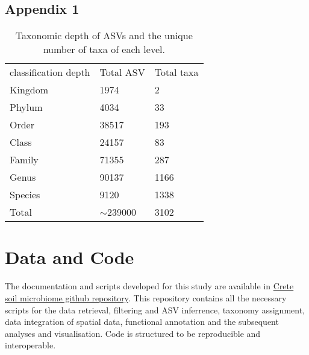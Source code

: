 \documentclass[unnumsec,webpdf,contemporary,large]{oup-authoring-template}%
\theoremstyle{thmstyleone}%
\theoremstyle{thmstyletwo}%
\theoremstyle{thmstylethree}%
\begin{document}
\begin{appendices}
\setcounter{table}{0}
\renewcommand{\thetable}{A\arabic{table}}

\section{Appendix 1}\label{appendix1}



\begin{table}[]
    \caption{Taxonomic depth of ASVs and the unique number of taxa of each level.\label{table:asv_taxonomy}}%
\begin{tabular}{@{}lll@{}}
classification depth & Total ASV    & Total taxa \\
Kingdom              & 1974         & 2          \\
Phylum               & 4034         & 33         \\
Order                & 38517        & 193        \\
Class                & 24157        & 83         \\
Family               & 71355        & 287        \\
Genus                & 90137        & 1166       \\
Species              & 9120         & 1338       \\
Total                & $\sim$239000 & 3102      
\end{tabular}
\label{table:asv_taxonomy}
\end{table}

%
%
\end{appendices}
\section{Data and Code}
The documentation and scripts developed for this study are available in
\href{https://github.com/savvas-paragkamian/crete_soil_microbiome/}{Crete soil microbiome github repository}.
This repository contains all the necessary scripts for the data retrieval,
filtering and ASV inferrence, taxonomy assignment, data integration of spatial data, 
functional annotation and the subsequent analyses and visualisation.
Code is structured to be reproducible and interoperable.
\end{document}
